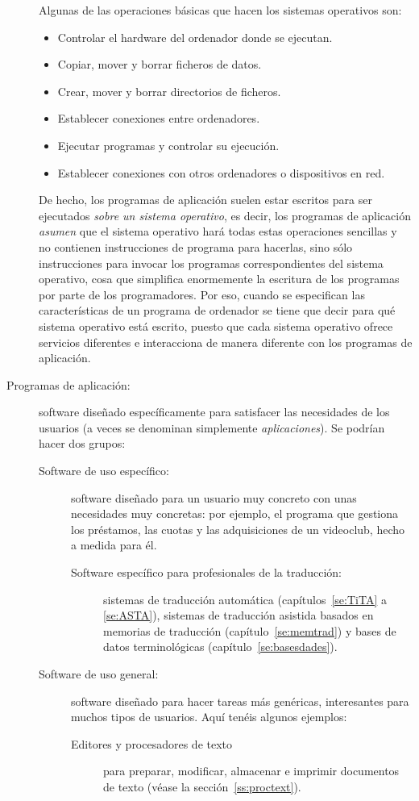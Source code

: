 \begin{description}
Algunas de las operaciones básicas que hacen los sistemas operativos son: \begin{itemize} \item Controlar el hardware del ordenador donde se ejecutan. \item Copiar, mover y borrar ficheros de datos. \item Crear, mover y borrar directorios de ficheros. \item Establecer conexiones entre ordenadores. \item Ejecutar programas y controlar su ejecución. \item Establecer conexiones con otros ordenadores o dispositivos en red. \end{itemize} De hecho, los programas de aplicación suelen estar escritos para ser ejecutados \emph{sobre un sistema operativo}, es decir, los programas de aplicación \emph{asumen} que el sistema operativo hará todas estas operaciones sencillas y no contienen instrucciones de programa para hacerlas, sino sólo instrucciones para invocar los programas correspondientes del sistema operativo, cosa que simplifica enormemente la escritura de los programas por parte de los programadores. Por eso, cuando se especifican las características de un programa de ordenador se tiene que decir para qué sistema operativo está escrito, puesto que cada sistema operativo ofrece servicios diferentes e interacciona de manera diferente con los programas de aplicación. 

\item[Programas de aplicación:] software diseñado específicamente para satisfacer las necesidades de los usuarios (a veces se denominan simplemente {\em aplicaciones}). Se podrían hacer dos grupos: \begin{description} \item[Software de uso específico:] software diseñado para un usuario muy concreto con unas necesidades muy concretas: por ejemplo, el programa que gestiona los préstamos, las cuotas y las adquisiciones de un videoclub, hecho a medida para él. \begin{description} \item[Software específico para profesionales de la traducción:] sistemas de traducción automática (capítulos~\ref{se:TiTA} a \ref{se:ASTA}), sistemas de traducción asistida basados en memorias de traducción (capítulo~\ref{se:memtrad}) y bases de datos terminológicas (capítulo~\ref{se:basesdades}). \end{description} \item[Software de uso general:] software diseñado para hacer tareas más genéricas, interesantes para muchos tipos de usuarios. Aquí tenéis algunos ejemplos: \begin{description} \item[Editores y procesadores de texto] para preparar, modificar, almacenar e imprimir documentos de texto (véase la sección~\ref{ss:proctext}). 


\end{description}
\end{description}
\end{description}
